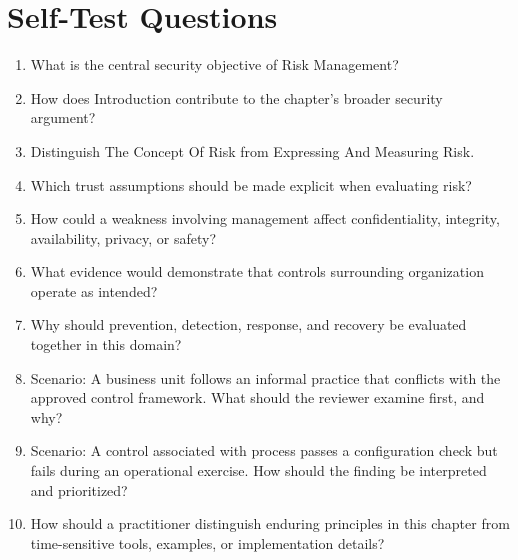 \documentclass[11pt]{article}
\begin{document}
\section*{Self-Test Questions}
\begin{enumerate}
\item What is the central security objective of Risk Management?
\item How does Introduction contribute to the chapter's broader security argument?
\item Distinguish The Concept Of Risk from Expressing And Measuring Risk.
\item Which trust assumptions should be made explicit when evaluating risk?
\item How could a weakness involving management affect confidentiality, integrity, availability, privacy, or safety?
\item What evidence would demonstrate that controls surrounding organization operate as intended?
\item Why should prevention, detection, response, and recovery be evaluated together in this domain?
\item Scenario: A business unit follows an informal practice that conflicts with the approved control framework. What should the reviewer examine first, and why?
\item Scenario: A control associated with process passes a configuration check but fails during an operational exercise. How should the finding be interpreted and prioritized?
\item How should a practitioner distinguish enduring principles in this chapter from time-sensitive tools, examples, or implementation details?
\end{enumerate}
\end{document}
